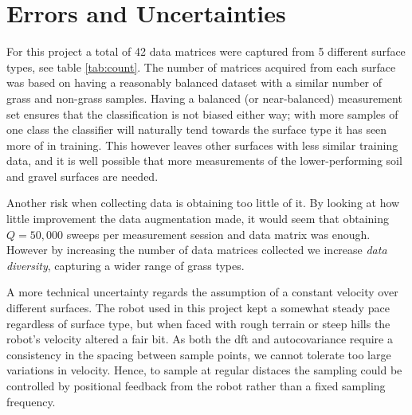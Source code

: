 \section{Errors and Uncertainties}
For this project a total of 42 data matrices were captured from 5 different surface types, see table \ref{tab:count}. The number of matrices acquired from each surface was based on having a reasonably balanced dataset with a similar number of grass and non-grass samples. Having a balanced (or near-balanced) measurement set ensures that the classification is not biased either way; with more samples of one class the classifier will naturally tend towards the surface type it has seen more of in training. This however leaves other surfaces with less similar training data, and it is well possible that more measurements of the lower-performing soil and gravel surfaces are needed.  


Another risk when collecting data is obtaining too little of it. By looking at how little improvement the data augmentation made, it would seem that obtaining $Q=50,000$ sweeps per measurement session and data matrix was enough. However by increasing the number of data matrices collected we increase \emph{data diversity}, capturing a wider range of grass types. 

A more technical uncertainty regards the assumption of a constant velocity over different surfaces. The robot used in this project kept a somewhat steady pace regardless of surface type, but when faced with rough terrain or steep hills the robot's velocity altered a fair bit. As both the \gls{dft} and autocovariance require a consistency in the spacing between sample points, we cannot tolerate too large variations in velocity. Hence, to sample at regular distaces the sampling could be controlled by positional feedback from the robot rather than a fixed sampling frequency.

